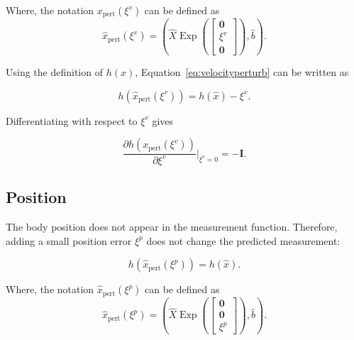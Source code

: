 \documentclass[report.tex]{subfiles}
\begin{document}
    Where, the notation $x_{\mathrm{pert}}(\xi^v)$ can be defined as 
    \begin{equation}
        \hat x_{\mathrm{pert}}(\xi^v)
        =
        \left(
            \hat{X}
            \operatorname{Exp}
            \left(
                \begin{bmatrix}
                    \mathbf{0} \\
                    \xi^v \\
                    \mathbf{0}
                \end{bmatrix}
            \right),
            \hat{b}
        \right).
        \label{eq:velocityPerturbedState}
    \end{equation}

    Using the definition of $h(x)$, Equation~\ref{eq:velocityperturb} can be written as

    \begin{equation}
        h(\hat x_{\mathrm{pert}}(\xi^v))
        =
        h(\hat x)-\xi^v.
    \end{equation}

    Differentiating with respect to $\xi^v$ gives

    \begin{equation}
        \frac{\partial h(x_{\mathrm{pert}}(\xi^v))}
        {\partial \xi^v}\bigg|_{\xi^v=0}
        =
        -\mathbf{I}.
    \end{equation}

    \subsection{Position}

    The body position does not appear in the measurement function. Therefore, adding a small position error $\xi^p$ does not change the predicted measurement:

    \begin{equation}
        h(\hat x_{\mathrm{pert}}(\xi^p))=h(\hat x).
    \end{equation}

    Where, the notation $\hat x_{\mathrm{pert}}(\xi^p)$ can be defined as 
    \begin{equation}
        \hat x_{\mathrm{pert}}(\xi^p)
        =
        \left(
            \hat{X}
            \operatorname{Exp}
            \left(
                \begin{bmatrix}
                    \mathbf{0} \\
                    \mathbf{0} \\
                    \xi^p
                \end{bmatrix}
            \right),
            \hat{b}
        \right).
        \label{eq:positionPerturbedState}
    \end{equation}
\end{document}
